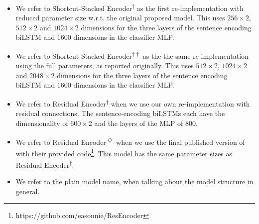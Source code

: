 \begin{itemize}
\item We refer to Shortcut-Stacked Encoder\textsuperscript{$\dagger$} as the first re-implementation with reduced parameter size w.r.t. the original proposed model. This uses $256\times2$, $512\times2$ and $1024\times2$ dimensions for the three layers of the sentence encoding \ac{biLSTM} and $1600$ dimensions in the classifier \ac{MLP}.
\item We refer to Shortcut-Stacked Encoder\textsuperscript{$\dagger\dagger$} as the the same re-implementation using the full parameters, as reported originally. This uses $512\times2$, $1024\times2$ and $2048\times2$ dimensions for the three layers of the sentence encoding \ac{biLSTM} and $1600$ dimensions in the classifier \ac{MLP}.
\item We refer to Residual Encoder\textsuperscript{$\dagger$} when we use our own re-implementation with residual connections. The sentence-encoding \ac{biLSTM}s each have the dimensionality of $600\times2$ and the layers of the \ac{MLP} of $800$.
\item We refer to Residual Encoder\textsuperscript{$\Diamond$} when we use the final published version of \cite{nie2017shortcut} with their provided code\footnote{https://github.com/easonnie/ResEncoder}. This model has the same parameter sizes as Residual Encoder\textsuperscript{$\dagger$}.
\item We refer to the plain model name, when talking about the model structure in general.
\end{itemize}
